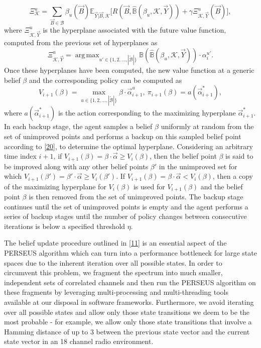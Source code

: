 \documentclass[10pt,twocolumn]{IEEEtran}
\DeclareMathOperator*{\argmax}{arg\,max}
\begin{document}
\begin{equation}
        \Xi_{\mathcal{K}}^{u} = \sum_{\vec{B} {\in} \mathcal{B}} \beta_{u}(\vec{B}) \mathbb{E}_{\vec{Y}|\vec{B}, \mathcal{K}} \Big[R(\vec{B}, \hat{\mathbb{B}}(\beta_{u}, \mathcal{K}, \vec{Y}))+\gamma 
        \Xi_{\mathcal{K}, \vec{Y}}^{u}(\vec{B})\Big],
\nonumber
\end{equation}
where $\Xi_{\mathcal{K}, \vec{Y}}^{u}$ is the hyperplane associated with the future value function, computed from the previous set of hyperplanes as
\begin{equation}
    \Xi_{\mathcal{K}, \vec{Y}}^{u}=\argmax_{u' {\in} \{1, 2, \dots, |\tilde{\mathcal{B}}|\}} \mathbb{B}(\hat{\mathbb{B}}(\beta_{u}, \mathcal{K}, \vec{Y}))\cdot\alpha_{i}^{u'}.
\nonumber
\end{equation}
Once these hyperplanes have been computed, the new value function at a generic belief $\beta$ and the corresponding policy can be computed as
\begin{equation}\label{40}
V_{i+1}(\beta) =\!\!\!\!\!\!\!\!\max_{u {\in} \{1, 2, \dots, |\tilde{\mathcal{B}}|\}}\! \beta \cdot \vec{\alpha}_{i+1}^u,
\ \pi_{i+1}(\beta) = a(\vec{\alpha}_{i+1}^{*}),\!\!
\end{equation}
where $a(\vec{\alpha}_{i+1}^{*})$ is the action corresponding to the maximizing hyperplane $\vec{\alpha}_{i+1}^{*}$. In each backup stage, the agent samples a belief $\beta$ uniformly at random from the set of unimproved points and performs a backup on this sampled belief point according to \eqref{20}, to determine the optimal hyperplane. Considering an arbitrary time index $i{+}1$, if $V_{i+1}(\beta) = \beta \cdot \vec{\alpha} \geq V_{i}(\beta)$, then the belief point $\beta$ is said to be improved along with any other belief points $\beta'$ in the unimproved set for which $V_{i+1}(\beta') = \beta' \cdot \vec{\alpha} \geq V_{i}(\beta')$. If $V_{i+1}(\beta) = \beta \cdot \vec{\alpha} < V_{i}(\beta)$, then a copy of the maximizing hyperplane for $V_i(\beta)$ is used for $V_{i+1}(\beta)$ and the belief point $\beta$ is then removed from the set of unimproved points. The backup stage continues until the set of unimproved points is empty and the agent performs a series of backup stages until the number of policy changes between consecutive iterations is below a specified threshold $\eta$.

The belief update procedure outlined in \eqref{11} is an essential aspect of the PERSEUS algorithm which can turn into a performance bottleneck for large state spaces due to the inherent iteration over all possible states. In order to circumvent this problem, we fragment the spectrum into much smaller, independent sets of correlated channels and then run the PERSEUS algorithm on these fragments by leveraging multi-processing and multi-threading tools available at our disposal in software frameworks. Furthermore, we avoid iterating over all possible states and allow only those state transitions we deem to be the most probable - for example, we allow only those state transitions that involve a Hamming distance of up to 3 between the previous state vector and the current state vector in an 18 channel radio environment.
\end{document}
